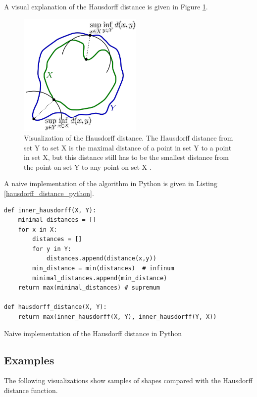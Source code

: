 A visual explanation of the Hausdorff distance is given in Figure \ref{hausdorff_distance}.

\begin{figure}[H]
\centering
\includegraphics[width=6cm]{chapters/06_hdm/images/hausdorff_distance.png}
\caption{Visualization of the Hausdorff distance. The Hausdorff distance from set Y to set X is the maximal distance of a point in set Y to a point in set X, but this distance still has to be the smallest distance from the point on set Y to any point on set X \cite{hausdorffdistanceimage}.}
\label{hausdorff_distance}
\end{figure}

A naive implementation of the algorithm in Python is given in Listing \ref{hausdorff_distance_python}.

\begin{listing}[H]
\begin{verbatim}
def inner_hausdorff(X, Y):
    minimal_distances = []
    for x in X:
        distances = []
        for y in Y:
            distances.append(distance(x,y))
        min_distance = min(distances)  # infinum
        minimal_distances.append(min_distance)
    return max(minimal_distances) # supremum

def hausdorff_distance(X, Y):
    return max(inner_hausdorff(X, Y), inner_hausdorff(Y, X))
\end{verbatim}
\caption{Naive implementation of the Hausdorff distance in Python}
\label{hausdorff_distance_python}
\end{listing}

\subsection{Examples}
The following visualizations show samples of shapes compared with the Hausdorff distance function.

